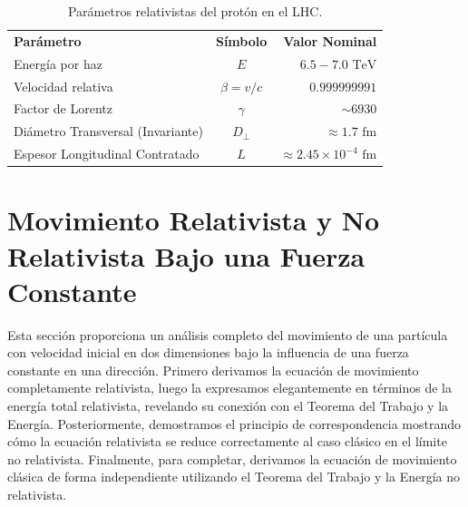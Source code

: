 \documentclass[11pt,a4paper]{book}
\begin{document}
\begin{table}[htbp]
\centering
\caption{Parámetros relativistas del protón en el LHC.}
\label{tab:parametros_lhc}
\vspace{0.2cm}
\begin{tabular}{lcr}
\textbf{Parámetro} & \textbf{Símbolo} & \textbf{Valor Nominal} \\
Energía por haz & $E$ & $6.5 - 7.0\text{ TeV}$ \\
Velocidad relativa & $\beta = v/c$ & $0.999999991$ \\
Factor de Lorentz & $\gamma$ & $\sim 6930$ \\
Diámetro Transversal (Invariante) & $D_{\perp}$ & $\approx 1.7\text{ fm}$ \\
Espesor Longitudinal Contratado & $L$ & $\approx 2.45 \times 10^{-4}\text{ fm}$ \\
\end{tabular}
\end{table}




\section{Movimiento Relativista y No Relativista Bajo una Fuerza Constante}
Esta sección proporciona un análisis completo del movimiento de una partícula con velocidad inicial en dos dimensiones bajo la influencia de una fuerza constante en una dirección. Primero derivamos la ecuación de movimiento completamente relativista, luego la expresamos elegantemente en términos de la energía total relativista, revelando su conexión con el Teorema del Trabajo y la Energía. Posteriormente, demostramos el principio de correspondencia mostrando cómo la ecuación relativista se reduce correctamente al caso clásico en el límite no relativista. Finalmente, para completar, derivamos la ecuación de movimiento clásica de forma independiente utilizando el Teorema del Trabajo y la Energía no relativista.
\end{document}
